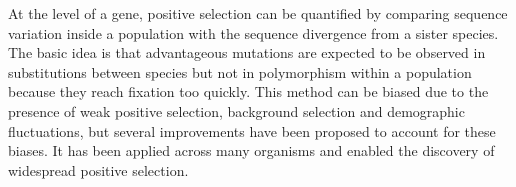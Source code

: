 \documentclass{article}
\begin{document}
    At the level of a gene, positive selection can be quantified by comparing sequence variation inside a population with the sequence divergence from a sister species\cite{mcdonald_adaptative_1991}.
    The basic idea is that advantageous mutations are expected to be observed in substitutions between species but not in polymorphism within a population because they reach fixation too quickly.
    This method can be biased due to the presence of weak positive selection, background selection and demographic fluctuations, but several improvements have been proposed to account for these biases\cite{eyre-walker_distribution_2006, eyre-walker_estimating_2009, galtier_adaptive_2016, tataru_inference_2017}.
    It has been applied across many organisms and enabled the discovery of widespread positive selection\cite{moutinho_variation_2019}.
\end{document}

